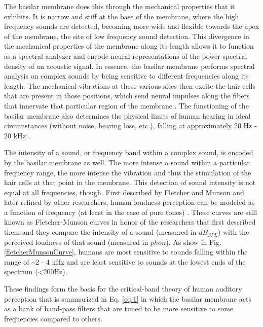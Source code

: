 \documentclass[titlepage]{article}
\begin{document}
    The basilar membrane does this through the mechanical properties that it exhibits.
    It is narrow and stiff at the base of the membrane, where the high frequency sounds
    are detected, becoming more wide and flexible towards the apex of the membrane, the
    site of low frequency sound detection. This divergence in the mechanical properties
    of the membrane along its length allows it to function as a spectral analyzer
    and encode neural representations of the power spectral density of an acoustic signal.
    In essence, the basilar membrane performs
    spectral analysis on complex sounds by being sensitive to different frequencies
    along its length. The mechanical vibrations at these various sites then excite
    the hair cells that are present in those positions, which send neural impulses along
    the fibers that innervate that particular region of the membrane \cite{Kandel2000}.
    The functioning of the basilar membrane also determines the physical limits of
    human hearing in ideal circumstances (without noise, hearing loss, etc.), falling
    at approximately 20 Hz - 20 kHz \cite{Rabiner2007}.

    The intensity of a sound, or frequency band within a complex sound, is encoded
    by the basilar membrane as well. The more intense a sound within a particular
    frequency range, the more intense the vibration and thus the stimulation of the
    hair cells at that point in the membrane. This detection of sound intensity
    is not equal at all frequencies, though. First described by Fletcher and Munson
    and later refined by other researchers, human loudness perception can be modeled
    as a function of frequency (at least in the case of pure tones) \cite{Fastl2007,Fletcher1933,Kandel2000}.
    These curves are still known as Fletcher-Munson curves in honor of the researchers
    that first described them and they compare the intensity of a sound (measured in $dB_{SPL}$)
    with the perceived loudness of that sound (measured in $phon$). As show in Fig. \ref{fletcherMunsonCurve},
    humans are most sensitive to sounds falling within the range of \textasciitilde 2 - 4 kHz and
    are least sensitive to sounds at the lowest ends of the spectrum (\textless 200Hz).

    These findings form the basis for the critical-band theory of human auditory
    perception that is summarized in Eq. \ref{eq:1} in which the basilar membrane
    acts as a bank of band-pass filters that are tuned to be more sensitive
    to some frequencies compared to others.
\end{document}
